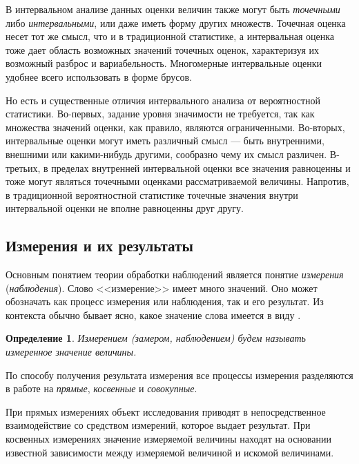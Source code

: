 \documentclass[a5paper,openany]{book}
\newtheorem{definition}{Определение}[section]
\begin{document}
{{В интервальном анализе данных оценки величин также могут быть \emph{точечными} 
либо \emph{интервальными}, или даже иметь форму других множеств. Точечная оценка 
несет тот же смысл, что и в традиционной статистике, а интервальная оценка тоже дает 
область возможных значений точечных оценок, характеризуя их возможный разброс и 
вариабельность. Многомерные интервальные оценки удобнее всего использовать в форме брусов. 

Но есть и существенные отличия интервального анализа от вероятностной статистики. 
Во-первых, задание уровня  значимости не требуется, так как множества значений оценки, как правило, являются ограниченными. 
Во-вторых, интервальные оценки могут иметь различный смысл --- быть внутренними, 
внешними или какими-нибудь другими, сообразно чему их смысл различен. 
В-третьих, в пределах внутренней интервальной оценки все значения равноценны и тоже могут являться точечными оценками рассматриваемой величины. 
Напротив, в традиционной вероятностной статистике точечные значения внутри интервальной 
оценки не вполне равноценны друг другу. 

\subsection{Измерения и их результаты} 
\label{MeasuResultSect}

	Основным понятием теории обработки наблюдений является понятие \emph{измерения} (\emph{наблюдения}). Слово <<измерение>> имеет много значений. Оно может 
обозначать как процесс измерения или наблюдения, так и его результат. Из контекста обычно 
бывает ясно, какое значение слова имеется в виду \cite{MetodikaBook}.  
\vspace{-2mm}
\begin{definition}       
	\textsl{Измерением (замером, наблюдением)} будем называть измеренное значение величины. 
\end{definition}
\vspace{-2mm}
\noindent
По способу получения результата измерения все процессы измерения разделяются 
в работе \cite{Malikov} на \emph{прямые}, \emph{косвенные} и \emph{совокупные}. 

При прямых измерениях объект исследования приводят в непосредственное взаимодействие 
со средством измерений, которое выдает результат.   
При косвенных измерениях значение измеряемой величины находят на основании  
известной зависимости между измеряемой величиной и искомой величинами. 

}}
\end{document}
